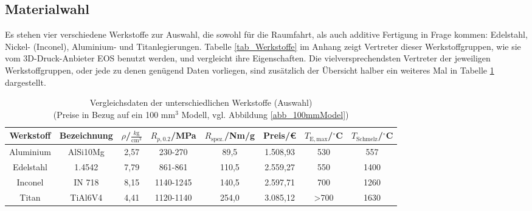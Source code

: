 \subsection{Materialwahl}
Es stehen vier verschiedene Werkstoffe zur Auswahl, die sowohl für die Raumfahrt, als auch additive Fertigung in Frage kommen: Edelstahl, Nickel- (Inconel), Aluminium- und Titanlegierungen. Tabelle \ref{tab_Werkstoffe} im Anhang zeigt Vertreter dieser Werkstoffgruppen, wie sie vom 3D-Druck-Anbieter EOS benutzt werden, und vergleicht ihre Eigenschaften. Die vielversprechendsten Vertreter der jeweiligen Werkstoffgruppen, oder jede zu denen genügend Daten vorliegen, sind zusätzlich der Übersicht halber ein weiteres Mal in Tabelle \ref{tab_WerkstoffeKlein} dargestellt.
\begin{table}[h] 
	\centering 
	\caption{Vergleichsdaten der unterschiedlichen Werkstoffe (Auswahl) \\ (Preise in Bezug auf ein 100 mm$^3$ Modell, vgl. Abbildung \ref{abb_100mmModel})}
	\label{tab_WerkstoffeKlein}
	\begin{tabular}{c|c|c|c|c|c|c|c} 
		Werkstoff&Bezeichnung&$\rho$/$\frac{k\mathrm{g}}{\mathrm{cm}^3}$&$R_{p,0.2}$/MPa&$R_\mathrm{spez.}$/Nm/g&Preis/€&$T_\mathrm{E, max}$/$^\circ$C&$T_\mathrm{Schmelz}$/$^\circ$C\\ 
		\hline 
		Aluminium&AlSi10Mg&2,57&230-270&89,5&1.508,93&530&557\\ 
		Edelstahl&1.4542&7,79&861-861&110,5&2.559,27&550&1400\\ 
		Inconel&IN 718&8,15&1140-1245&140,5&2.597,71&700&1260\\ 
		Titan&TiAl6V4&4,41&1120-1140&254,0&3.085,12&>700&1630\\ 
	\end{tabular} 
	\begin{flushright} 
	\end{flushright} 
\end{table} \\

